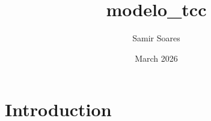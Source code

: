 \documentclass{article}
\title{modelo_tcc}
\author{Samir Soares}
\date{March 2026}
\begin{document}
\maketitle

\section{Introduction}
\end{document}
